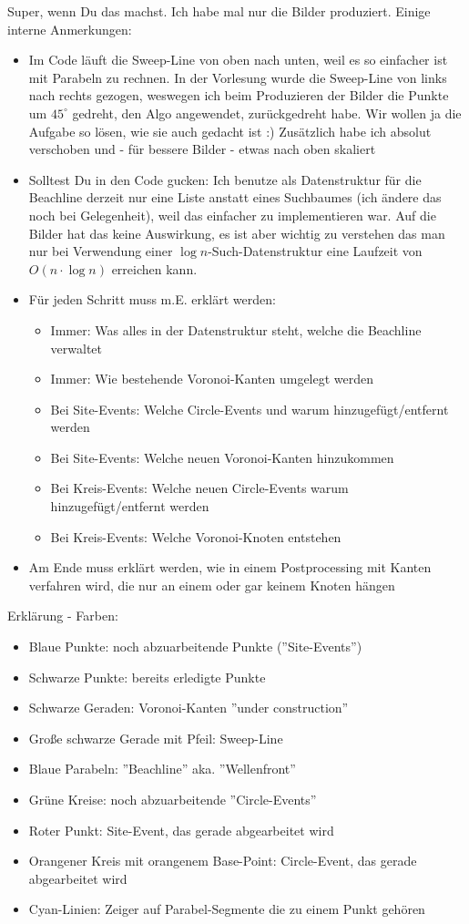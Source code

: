 Super, wenn Du das machst. Ich habe mal nur die Bilder produziert. Einige interne Anmerkungen:
\begin{itemize}
\item Im Code läuft die Sweep-Line von oben nach unten, weil es so einfacher ist mit Parabeln zu rechnen. In der Vorlesung wurde die Sweep-Line von links nach rechts gezogen, weswegen ich beim Produzieren der Bilder die Punkte um $45^\circ$ gedreht, den Algo angewendet, zurückgedreht habe. Wir wollen ja die Aufgabe so lösen, wie sie auch gedacht ist :) Zusätzlich habe ich absolut verschoben und - für bessere Bilder - etwas nach oben skaliert
\item Solltest Du in den Code gucken: Ich benutze als Datenstruktur für die Beachline derzeit nur eine Liste anstatt eines Suchbaumes (ich ändere das noch bei Gelegenheit), weil das einfacher zu implementieren war. Auf die Bilder hat das keine Auswirkung, es ist aber wichtig zu verstehen das man nur bei Verwendung einer $\log n$-Such-Datenstruktur eine Laufzeit von $O(n\cdot\log n)$ erreichen kann.
\item Für jeden Schritt muss m.E. erklärt werden:
\begin{itemize}
\item Immer: Was alles in der Datenstruktur steht, welche die Beachline verwaltet
\item Immer: Wie bestehende Voronoi-Kanten umgelegt werden
\item Bei Site-Events: Welche Circle-Events und warum hinzugefügt/entfernt werden
\item Bei Site-Events: Welche neuen Voronoi-Kanten hinzukommen
\item Bei Kreis-Events: Welche neuen Circle-Events warum hinzugefügt/entfernt werden
\item Bei Kreis-Events: Welche Voronoi-Knoten entstehen
\end{itemize}
\item Am Ende muss erklärt werden, wie in einem Postprocessing mit Kanten verfahren wird, die nur an einem oder gar keinem Knoten hängen 
\end{itemize}

Erklärung - Farben:
\begin{itemize}
\item Blaue Punkte: noch abzuarbeitende Punkte (''Site-Events'')
\item Schwarze Punkte: bereits erledigte Punkte
\item Schwarze Geraden: Voronoi-Kanten ''under construction''
\item Große schwarze Gerade mit Pfeil: Sweep-Line
\item Blaue Parabeln: ''Beachline'' aka. ''Wellenfront''
\item Grüne Kreise: noch abzuarbeitende ''Circle-Events''
\item Roter Punkt: Site-Event, das gerade abgearbeitet wird
\item Orangener Kreis mit orangenem Base-Point: Circle-Event, das gerade abgearbeitet wird
\item Cyan-Linien: Zeiger auf Parabel-Segmente die zu einem Punkt gehören
\end{itemize}

